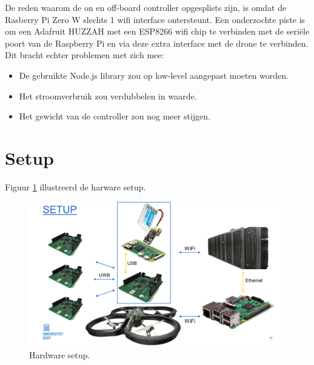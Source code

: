 De reden waarom de on en off-board controller opgesplists zijn, is omdat de Rasberry Pi Zero W slechts 1 wifi interface ontersteunt.
Een onderzochte piste is om een Adafruit HUZZAH met een ESP8266 wifi chip te verbinden met de seri\"ele poort van de Raspberry Pi en via deze extra interface met de drone te verbinden.\\
Dit bracht echter problemen met zich mee:
\begin{itemize}
	\item De gebruikte Node.js library zou op low-level aangepast moeten worden.
	\item Het stroomverbruik zou verdubbelen in waarde.
	\item Het gewicht van de controller zou nog meer stijgen.
\end{itemize}

\section{Setup} \label{sec:setup_hardware}
Figuur \ref{fig:setup_hardware} illustreerd de harware setup.
\begin{figure}[p]
	\centering
	\includegraphics[width=\textwidth]{Setup}
	\caption[Hardware setup]{Hardware setup.}
	\label{fig:setup_hardware}
\end{figure}